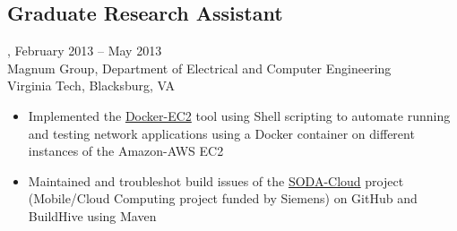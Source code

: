 \subsection{Graduate Research Assistant}, February 2013 -- May 2013\\
Magnum Group, Department of Electrical and Computer Engineering\\
Virginia Tech, Blacksburg, VA
\begin{itemize}
\item Implemented the \href{https://github.com/amrabed/docker-ec2}{Docker-EC2} tool using Shell scripting to automate running and testing network applications using a Docker container on different instances of the Amazon-AWS EC2
\item Maintained and troubleshot build issues of the \href{https://github.com/VT-Magnum-Research/sodacloud}{SODA-Cloud} project (Mobile/Cloud Computing project funded by Siemens) on GitHub and BuildHive using Maven
\end{itemize}
